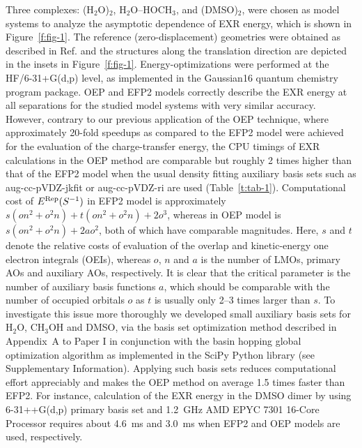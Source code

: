 Three complexes: 
(H$_2$O)$_2$, 
H$_2$O--HOCH$_3$, and
(DMSO)$_2$,
were chosen as model systems to analyze the asymptotic dependence 
of EXR energy, which is shown in Figure~\ref{f:fig-1}. 
The reference (zero\hyp{}displacement) geometries
were obtained as described in Ref.\cite{Blasiak.Bednarska.Choluj.Bartkowiak.JCP.2019} 
and the structures  
along the translation direction are depicted
in the insets in Figure~\ref{f:fig-1}.
Energy\hyp{}optimizations were performed at the HF/6-31+G(d,p) level,
as implemented in 
the {\sc Gaussian16} quantum chemistry program package.\cite{Gaussian16}
OEP and EFP2 models correctly describe the EXR energy at all separations
for the studied model systems with very similar accuracy. 
However,
contrary to our previous application of the OEP technique\cite{Blasiak.Bednarska.Choluj.Bartkowiak.JCP.2019},
where approximately 20\hyp{}fold speedups as compared to the EFP2 model were achieved
for the evaluation of the charge\hyp{}transfer energy,
the CPU timings of EXR calculations in the OEP method are comparable but roughly 2
times higher than that of the EFP2 model
when the usual density fitting auxiliary basis sets such as aug-cc-pVDZ-jkfit or aug-cc-pVDZ-ri are used
(Table~\ref{t:tab-1}).
Computational cost of $E^{\rm Rep}(S^{-1})$ in EFP2 model
is approximately $s(on^2 + o^2n) + t(on^2 + o^2n) + 2o^3$, whereas in OEP model
is $s(on^2 + o^2n) + 2ao^2$, both of which have comparable magnitudes. 
Here, $s$ and $t$ denote the relative costs of evaluation of the overlap
and kinetic-energy one electron integrals (OEIs), whereas $o$, $n$ and $a$ is
the number of LMOs, primary AOs and auxiliary AOs, respectively.
It is clear that the critical parameter is the number of auxiliary basis functions $a$,
which should be comparable with the number of occupied orbitals $o$ 
as $t$ is usually only 2--3 times larger than $s$.
To investigate this issue more thoroughly we developed small auxiliary basis sets for H$_2$O, CH$_3$OH and DMSO, 
via the basis set optimization method described in Appendix~A to Paper I
in conjunction with the basin hopping global optimization algorithm\cite{Wales.EnergyLandscapes.2003,
Wales.Scheraga.Science.1999,
Wales.Doye.JPCA.1997,Li.Scheraga.PNAS.1987}
as implemented in the SciPy Python library\cite{SciPy.2019}
(see Supplementary Information).
Applying such basis sets
reduces computational effort appreciably and makes the OEP method on average 1.5 times faster than EFP2.
For instance, calculation of the EXR energy in the DMSO dimer by using 6-31++G(d,p) primary
basis set and 
1.2~GHz AMD EPYC\texttrademark{} 7301 16-Core Processor
requires about 4.6~ms and 3.0~ms when EFP2 and OEP models are used, respectively.

